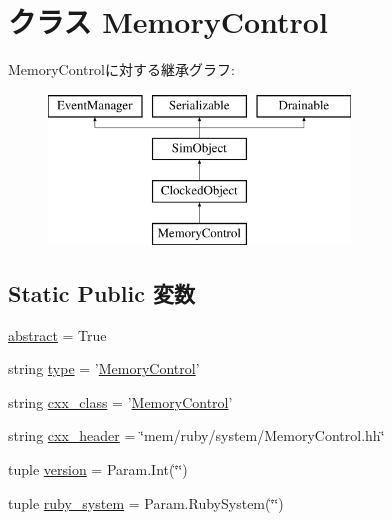 \hypertarget{classMemoryControl_1_1MemoryControl}{
\section{クラス MemoryControl}
\label{classMemoryControl_1_1MemoryControl}
}
MemoryControlに対する継承グラフ:\begin{figure}[H]
\begin{center}
\leavevmode
\includegraphics[height=4cm]{classMemoryControl_1_1MemoryControl}
\end{center}
\end{figure}
\subsection*{Static Public 変数}
\begin{DoxyCompactItemize}
\item 
\hyperlink{classMemoryControl_1_1MemoryControl_a17fa61ac3806b481cafee5593b55e5d0}{abstract} = True
\item 
string \hyperlink{classMemoryControl_1_1MemoryControl_acce15679d830831b0bbe8ebc2a60b2ca}{type} = '\hyperlink{classMemoryControl_1_1MemoryControl}{MemoryControl}'
\item 
string \hyperlink{classMemoryControl_1_1MemoryControl_a58cd55cd4023648e138237cfc0822ae3}{cxx\_\-class} = '\hyperlink{classMemoryControl_1_1MemoryControl}{MemoryControl}'
\item 
string \hyperlink{classMemoryControl_1_1MemoryControl_a17da7064bc5c518791f0c891eff05fda}{cxx\_\-header} = \char`\"{}mem/ruby/system/MemoryControl.hh\char`\"{}
\item 
tuple \hyperlink{classMemoryControl_1_1MemoryControl_a76aa01cd80eeb03b381ebe36f17c16b2}{version} = Param.Int(\char`\"{}\char`\"{})
\item 
tuple \hyperlink{classMemoryControl_1_1MemoryControl_ad43d9de73a55aa43ab5023d7815d7286}{ruby\_\-system} = Param.RubySystem(\char`\"{}\char`\"{})
\end{DoxyCompactItemize}


